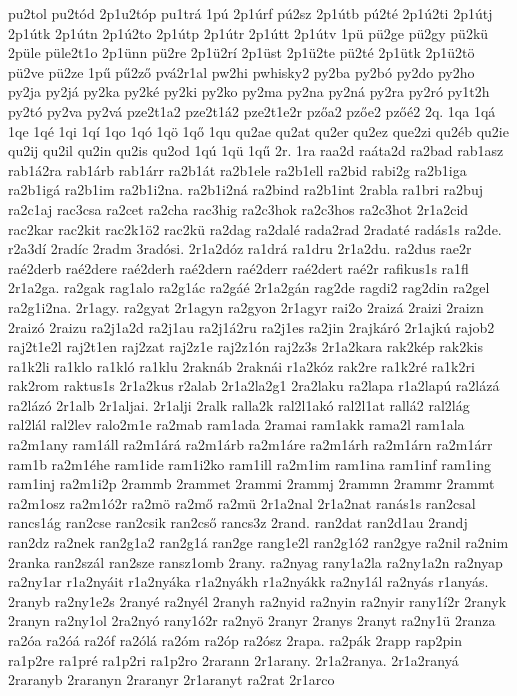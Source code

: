 {pu2tol
pu2tód
2p1u2tóp
pu1trá
1pú
2p1úrf
pú2sz
2p1útb
pú2té
2p1ú2ti
2p1útj
2p1útk
2p1útn
2p1ú2to
2p1útp
2p1útr
2p1útt
2p1útv
1pü
pü2ge
pü2gy
pü2kü
2püle
püle2t1o
2p1ünn
pü2re
2p1ü2rí
2p1üst
2p1ü2te
pü2té
2p1ütk
2p1ü2tö
pü2ve
pü2ze
1pű
pű2ző
pvá2r1al
pw2hi
pwhisky2
py2ba
py2bó
py2do
py2ho
py2ja
py2já
py2ka
py2ké
py2ki
py2ko
py2ma
py2na
py2ná
py2ra
py2ró
py1t2h
py2tó
py2va
py2vá
pze2t1a2
pze2t1á2
pze2t1e2r
pzőa2
pzőe2
pzőé2
2q.
1qa
1qá
1qe
1qé
1qi
1qí
1qo
1qó
1qö
1qő
1qu
qu2ae
qu2at
qu2er
qu2ez
que2zi
qu2éb
qu2ie
qu2ij
qu2il
qu2in
qu2is
qu2od
1qú
1qü
1qű
2r.
1ra
raa2d
raáta2d
ra2bad
rab1asz
rab1á2ra
rab1árb
rab1árr
ra2b1át
ra2b1ele
ra2b1ell
ra2bid
rabi2g
ra2b1iga
ra2b1igá
ra2b1im
ra2b1i2na.
ra2b1i2ná
ra2bind
ra2b1int
2rabla
ra1bri
ra2buj
ra2c1aj
rac3csa
ra2cet
ra2cha
rac3hig
ra2c3hok
ra2c3hos
ra2c3hot
2r1a2cid
rac2kar
rac2kit
rac2k1ö2
rac2kü
ra2dag
ra2dalé
rada2rad
2radaté
radás1s
ra2de.
r2a3dí
2radíc
2radm
3radósi.
2r1a2dóz
ra1drá
ra1dru
2r1a2du.
ra2dus
rae2r
raé2derb
raé2dere
raé2derh
raé2dern
raé2derr
raé2dert
raé2r
rafikus1s
ra1fl
2r1a2ga.
ra2gak
rag1alo
ra2g1ác
ra2gáé
2r1a2gán
rag2de
ragdi2
rag2din
ra2gel
ra2g1i2na.
2r1agy.
ra2gyat
2r1agyn
ra2gyon
2r1agyr
rai2o
2raizá
2raizi
2raizn
2raizó
2raizu
ra2j1a2d
ra2j1au
ra2j1á2ru
ra2j1es
ra2jin
2rajkáró
2r1ajkú
rajob2
raj2t1e2l
raj2t1en
raj2zat
raj2z1e
raj2z1ón
raj2z3s
2r1a2kara
rak2kép
rak2kis
ra1k2li
ra1klo
ra1kló
ra1klu
2raknáb
2raknái
r1a2kóz
rak2re
ra1k2ré
ra1k2ri
rak2rom
raktus1s
2r1a2kus
r2alab
2r1a2la2g1
2ra2laku
ra2lapa
r1a2lapú
ra2lázá
ra2lázó
2r1alb
2r1aljai.
2r1alji
2ralk
ralla2k
ral2l1akó
ral2l1at
rallá2
ral2lág
ral2lál
ral2lev
ralo2m1e
ra2mab
ram1ada
2ramai
ram1akk
rama2l
ram1ala
ra2m1any
ram1áll
ra2m1árá
ra2m1árb
ra2m1áre
ra2m1árh
ra2m1árn
ra2m1árr
ram1b
ra2m1éhe
ram1ide
ram1i2ko
ram1ill
ra2m1im
ram1ina
ram1inf
ram1ing
ram1inj
ra2m1i2p
2rammb
2rammet
2rammi
2rammj
2rammn
2rammr
2rammt
ra2m1osz
ra2m1ó2r
ra2mö
ra2mő
ra2mü
2r1a2nal
2r1a2nat
ranás1s
ran2csal
rancs1ág
ran2cse
ran2csik
ran2cső
rancs3z
2rand.
ran2dat
ran2d1au
2randj
ran2dz
ra2nek
ran2g1a2
ran2g1á
ran2ge
rang1e2l
ran2g1ó2
ran2gye
ra2nil
ra2nim
2ranka
ran2szál
ran2sze
ransz1omb
2rany.
ra2nyag
rany1a2la
ra2ny1a2n
ra2nyap
ra2ny1ar
r1a2nyáit
r1a2nyáka
r1a2nyákh
r1a2nyákk
ra2ny1ál
ra2nyás
r1anyás.
2ranyb
ra2ny1e2s
2ranyé
ra2nyél
2ranyh
ra2nyid
ra2nyin
ra2nyir
rany1í2r
2ranyk
2ranyn
ra2ny1ol
2ra2nyó
rany1ó2r
ra2nyö
2ranyr
2ranys
2ranyt
ra2ny1ü
2ranza
ra2óa
ra2óá
ra2óf
ra2ólá
ra2óm
ra2óp
ra2ósz
2rapa.
ra2pák
2rapp
rap2pin
ra1p2re
ra1pré
ra1p2ri
ra1p2ro
2rarann
2r1arany.
2r1a2ranya.
2r1a2ranyá
2raranyb
2raranyn
2raranyr
2r1aranyt
ra2rat
2r1arco
}
